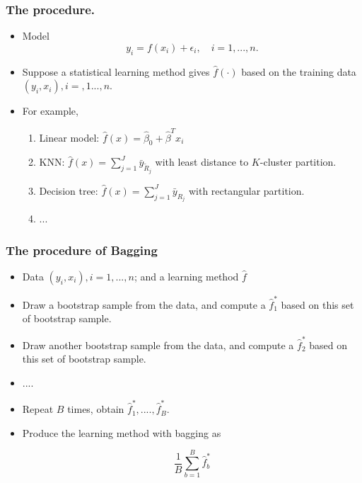 \documentclass{beamer}
\begin{document}
                   \begin{frame}
                   \frametitle{The procedure.  }
                   \begin{itemize}
                   \item  Model
                   $$ y_i = f(x_i) +\epsilon_i, \quad i=1,..., n.$$
                   \item Suppose a statistical learning method gives $\hat f(\cdot)$ based on the training data
                   $ (y_i, x_i), i=,1..., n$.
                   \item  For example, 
                   \begin{enumerate} 
                   	\item Linear model: $\hat f(x) = \hat \beta_0  + \hat \beta^Tx_i$
                 
                   \item  KNN: $\hat f(x) = \sum_{j=1}^J \bar y_{\tilde R_j}$ with least distance to $K$-cluster partition. 
                   \item  Decision tree: $\hat f(x) = \sum_{j=1}^J \bar y_{R_j}$ with rectangular partition.
                   \item ...
               \end{enumerate}
              	\end{itemize}
              \end{frame}   
                     
                     \begin{frame}
                     	\frametitle{The procedure of Bagging  }
                     	\begin{itemize}
                     		\item Data $(y_i, x_i), i=1,..., n$; and a learning method 
                     		$\hat f$  
                     		\item Draw a bootstrap sample from the data, and compute a $\hat f^*_1$ based on 
                     		this set of bootstrap sample. 
                     		\item    Draw another bootstrap sample from the data, and 
                     		compute a $\hat f^*_2$ based on 
                     		this set of bootstrap sample. 
                     		\item .... 
                     		\item Repeat $B$ times, obtain $\hat f^*_1, ...., \hat f^*_B$.
                     		\item Produce the  learning method with bagging as
                     		
                     		$$ \frac{1}{B} \sum_{b=1}^B \hat f^*_b$$
                     		
                     		
                     		
                   \end{itemize}
                   \end{frame} 
                   
\end{document}
